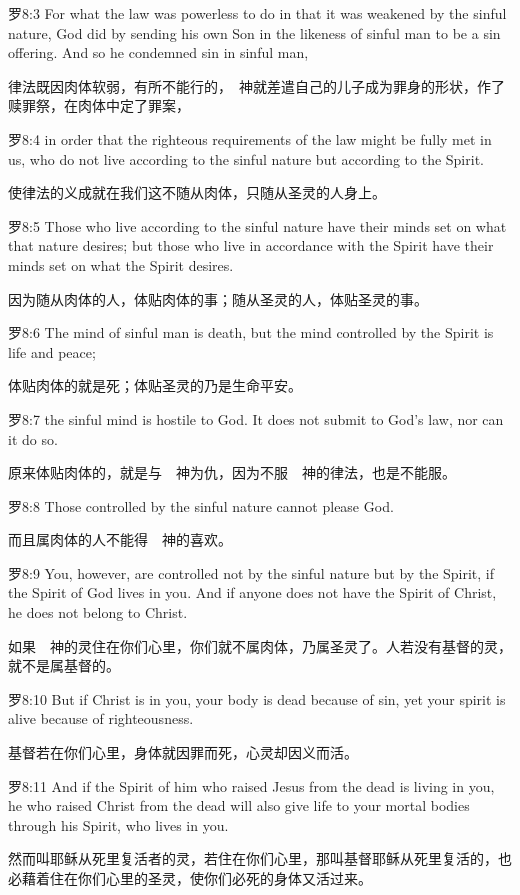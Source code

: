 \documentclass[a4paper,11pt,onecolumn,twoside]{ctexart}
\begin{document}
\begin{multicols}{2}
 罗8:3
 For what the law was powerless to do in that it was weakened by the sinful nature, God did by sending his own Son in the likeness of sinful man to be a sin offering. And so he condemned sin in sinful man,

 律法既因肉体软弱，有所不能行的，　神就差遣自己的儿子成为罪身的形状，作了赎罪祭，在肉体中定了罪案，


 罗8:4
 in order that the righteous requirements of the law might be fully met in us, who do not live according to the sinful nature but according to the Spirit.

 使律法的义成就在我们这不随从肉体，只随从圣灵的人身上。


 罗8:5
 Those who live according to the sinful nature have their minds set on what that nature desires; but those who live in accordance with the Spirit have their minds set on what the Spirit desires.

 因为随从肉体的人，体贴肉体的事；随从圣灵的人，体贴圣灵的事。


 罗8:6
 The mind of sinful man is death, but the mind controlled by the Spirit is life and peace;

 体贴肉体的就是死；体贴圣灵的乃是生命平安。


 罗8:7
 the sinful mind is hostile to God. It does not submit to God's law, nor can it do so.

 原来体贴肉体的，就是与　神为仇，因为不服　神的律法，也是不能服。


 罗8:8
 Those controlled by the sinful nature cannot please God.

 而且属肉体的人不能得　神的喜欢。


 罗8:9
 You, however, are controlled not by the sinful nature but by the Spirit, if the Spirit of God lives in you. And if anyone does not have the Spirit of Christ, he does not belong to Christ.

 如果　神的灵住在你们心里，你们就不属肉体，乃属圣灵了。人若没有基督的灵，就不是属基督的。


 罗8:10
 But if Christ is in you, your body is dead because of sin, yet your spirit is alive because of righteousness.

 基督若在你们心里，身体就因罪而死，心灵却因义而活。


 罗8:11
 And if the Spirit of him who raised Jesus from the dead is living in you, he who raised Christ from the dead will also give life to your mortal bodies through his Spirit, who lives in you.

 然而叫耶稣从死里复活者的灵，若住在你们心里，那叫基督耶稣从死里复活的，也必藉着住在你们心里的圣灵，使你们必死的身体又活过来。



\end{multicols}
\end{document}
